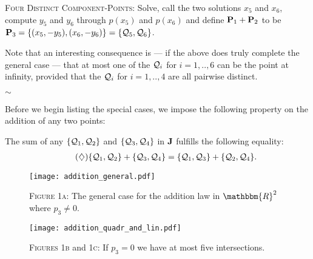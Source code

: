 \begin{case} {\scshape Four Distinct Component-Points:}
	Solve, call the two solutions $x_5$ and $x_6$, compute $y_5$ and $y_6$ through $p(x_5)$ and $p(x_6)$ and define $\P_1+\P_2$ to be $\P_3=\{ (x_5,-y_5) , (x_6,-y_6) \}=\{ \q_5, \q_6 \}$.

\begin{remark}
	Note that an interesting consequence is --- if the above does truly complete the general case --- that at most one of the $\q_i$ for $i=1, .. , 6$ can be the point at infinity, provided that the $\q_i$ for $i=1, .. , 4$ are all pairwise distinct.
\end{remark}
\end{case}
\vspace{-5mm}
\begin{center}
$\sim$
\end{center}

Before we begin listing the special cases, we impose the following property on the addition of any two points:

The sum of any $\{\q_1,\q_2\}$ and $\{\q_3,\q_4\}$ in $\J$ fulfills the following equality:
\begin{align*}
	\tag{$\diamondsuit$} \label{switch} \{\q_1,\q_2\} + \{\q_3,\q_4\} = \{\q_1,\q_3\} + \{\q_2,\q_4\}.
\end{align*}

\newpage
\begin{figure}[ht]
	\fline
	\begin{center}
		\vspace{1mm}
		\texttt{[image: addition\_general.pdf]}

		{\scshape Figure 1a}: The general case for the addition law in $\mathbbm{R}^2$ where $p_3 \neq 0$.

		\vspace{1mm}

		\texttt{[image: addition\_quadr\_and\_lin.pdf]}

		{\scshape Figures 1b} and {\scshape 1c}: If $p_3 = 0$ we have at most five intersections.
	\end{center}
	\vspace{-1.5mm}
	\fline
\end{figure}

